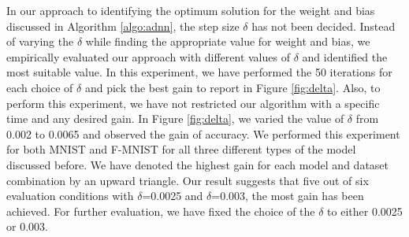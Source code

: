 In our approach to identifying the optimum solution for the weight and bias discussed in
Algorithm \ref{algo:adnn}, the step size $\delta$ has not been decided. Instead of varying the $\delta$ while finding the appropriate value for weight and bias, we empirically evaluated our approach with different values of $\delta$ and identified the most suitable value. In this experiment, we have performed the 50 iterations for each choice of $\delta$ and pick the best gain to report in Figure \ref{fig:delta}. Also, to perform this experiment, we have not restricted our algorithm with a specific time and any desired gain. In Figure \ref{fig:delta}, we varied the value of $\delta$ from 0.002 to 0.0065 and observed the gain of accuracy. We performed this experiment for both MNIST and F-MNIST for all three different types of the model discussed before. We have denoted the highest gain for each model and dataset combination by an upward triangle. Our result suggests that five out of six evaluation conditions with $\delta$=0.0025 and $\delta$=0.003, the most gain has been achieved. For further evaluation, we have fixed the choice of the $\delta$ to either 0.0025 or 0.003.
